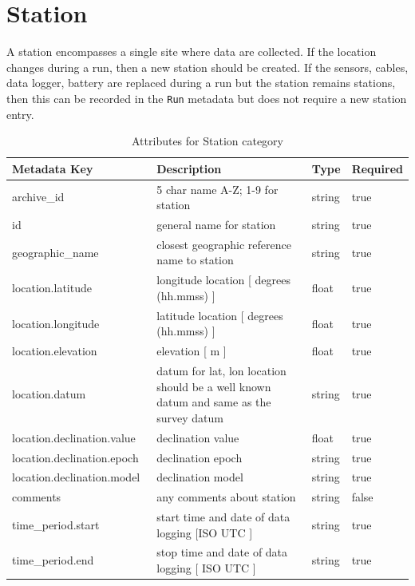 \documentclass{article}
\begin{document}
\newpage
\section{Station}

A station encompasses a single site where data are collected. If the location changes during a run, then a new station should be created. If the sensors, cables, data logger, battery are replaced during a run but the station remains stations, then this can be recorded in the \verb|Run| metadata but does not require a new station entry.

\begin{table}[htb!]
    \caption[Attributes for Station]{Attributes for Station category}
    \begin{tabular}{|l|p{3in}|l|l|}
        \hline
        \textbf{Metadata Key} & \textbf{Description} & \textbf{Type} & \textbf{Required} \\ \hline
        archive\_id\ & 5 char name {A-Z; 1-9} for station & string & true \\ \hline
        id\ & general name for station & string & true \\ \hline
        geographic\_name\ & closest geographic reference name to station  & string & true \\ \hline
        location.latitude\ & longitude location [ degrees (hh.mmss) ] & float & true \\ \hline
        location.longitude\ & latitude location [ degrees (hh.mmss) ] & float & true \\ \hline
        location.elevation\ & elevation [ m ] & float & true \\ \hline
        location.datum\ & datum for lat, lon location should be a well known datum and same as the survey datum & string & true \\ \hline
        location.declination.value\ & declination value & float & true \\ \hline
        location.declination.epoch\ & declination epoch & string & true \\ \hline
        location.declination.model\ & declination model & string & true \\ \hline
        comments\ & any comments about station & string & false \\ \hline 
        time\_period.start\ & start time and date of data logging [ISO UTC ] & string & true \\ \hline
        time\_period.end\ & stop time and date of data logging  [ ISO UTC ] & string & true \\ \hline

\end{tabular}
\end{table}
\end{document}
